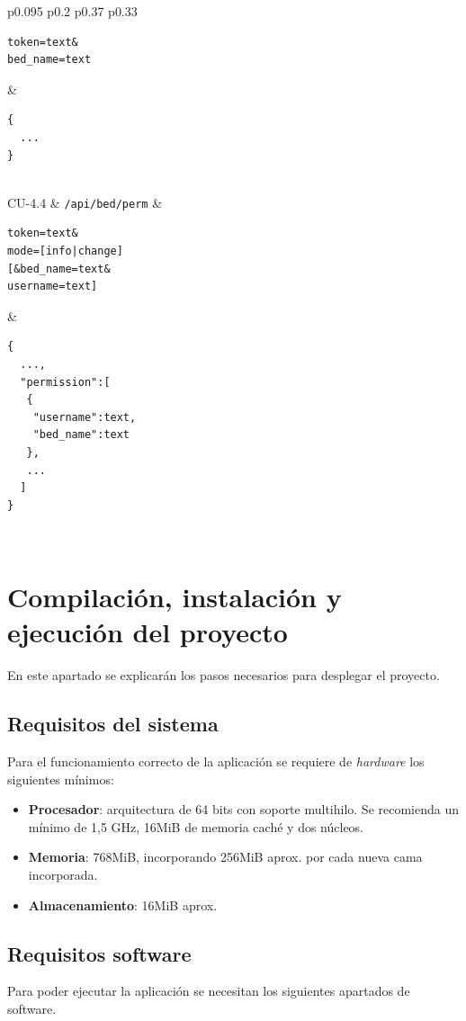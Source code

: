 \begin{center}
\begin{xtabular}{p{0.095\textwidth} p{0.2\textwidth} p{0.37\textwidth} p{0.33\textwidth}}
\begin{lstlisting}[language=JSONT]
token=text&
bed_name=text
\end{lstlisting}
&
\begin{lstlisting}[language=JSONT]
{
  ...
}\end{lstlisting}
\\\hubu
CU-4.4		&	\texttt{/api/bed/perm}	& 
\begin{lstlisting}[language=JSONT]
token=text&
mode=[info|change]
[&bed_name=text&
username=text]
\end{lstlisting}
&
\begin{lstlisting}[language=JSONT]
{
  ...,
  "permission":[
   {
    "username":text,
    "bed_name":text
   },
   ...
  ]
}\end{lstlisting}
\\\bottomrule
	\end{xtabular}
	\label{tabla:api-specs2}
\end{center}

\section{Compilación, instalación y ejecución del proyecto}

En este apartado se explicarán los pasos necesarios para desplegar el proyecto.

\subsection{Requisitos del sistema}

Para el funcionamiento correcto de la aplicación se requiere de \textit{hardware} los siguientes mínimos:

\begin{itemize}
	\item \textbf{Procesador}: arquitectura de 64 bits con soporte multihilo. Se recomienda un mínimo de 1,5 GHz, 16MiB de memoria caché y dos núcleos.
	\item \textbf{Memoria}: 768MiB, incorporando 256MiB aprox. por cada nueva cama incorporada. 
	\item \textbf{Almacenamiento}: 16MiB aprox.
\end{itemize}

\subsection{Requisitos software}

Para poder ejecutar la aplicación se necesitan los siguientes apartados de software.

